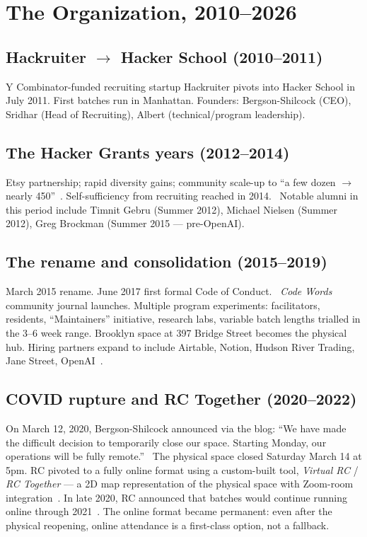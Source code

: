 \documentclass[10pt,letterpaper,twocolumn]{article}
\begin{document}
\section{The Organization, 2010--2026}

\subsection{Hackruiter $\to$ Hacker School (2010--2011)}

Y Combinator-funded recruiting startup Hackruiter pivots into Hacker School in July 2011. First batches run in Manhattan. Founders: Bergson-Shilcock (CEO), Sridhar (Head of Recruiting), Albert (technical/program leadership).

\subsection{The Hacker Grants years (2012--2014)}

Etsy partnership; rapid diversity gains; community scale-up to ``a few dozen $\to$ nearly 450''~\citep{rcseven}. Self-sufficiency from recruiting reached in 2014.~\citep{wikipediarc} Notable alumni in this period include Timnit Gebru (Summer 2012), Michael Nielsen (Summer 2012), Greg Brockman (Summer 2015 --- pre-OpenAI).

\subsection{The rename and consolidation (2015--2019)}

March 2015 rename. June 2017 first formal Code of Conduct.~\citep{wikipediarc} \emph{Code Words} community journal launches. Multiple program experiments: facilitators, residents, ``Maintainers'' initiative, research labs, variable batch lengths trialled in the 3--6 week range. Brooklyn space at 397 Bridge Street becomes the physical hub. Hiring partners expand to include Airtable, Notion, Hudson River Trading, Jane Street, OpenAI~\citep{wikipediarc}.

\subsection{COVID rupture and RC Together (2020--2022)}

On March 12, 2020, Bergson-Shilcock announced via the blog: ``We have made the difficult decision to temporarily close our space. Starting Monday, our operations will be fully remote.''~\citep{rccovidpost} The physical space closed Saturday March 14 at 5pm. RC pivoted to a fully online format using a custom-built tool, \emph{Virtual RC} / \emph{RC Together} --- a 2D map representation of the physical space with Zoom-room integration~\citep{rcvirtualpage}. In late 2020, RC announced that batches would continue running online through 2021~\citep{rconlineblog}. The online format became permanent: even after the physical reopening, online attendance is a first-class option, not a fallback.
\end{document}

